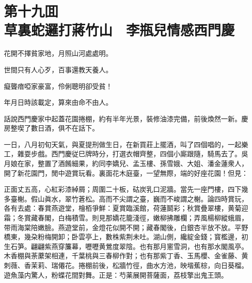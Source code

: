 
\chapter*{第十九囬　\\草裏蛇邏打蔣竹山　李瓶兒情感西門慶}


\begin{myquote}
花開不擇貧家地，月照山河處處明。

世間只有人心歹，百事還教天養人。

癡聾瘖啞家豪富，伶俐聰明卻受貧！

年月日時該載定，算來由命不由人。
\end{myquote}

話說西門慶家中起蓋花園捲棚，約有半年光景，裝修油漆完備，前後煥然一新。慶房整喫了數日酒，俱不在話下。

一日，八月初旬天氣，與夏提刑做生日，在新買莊上擺酒，叫了四個唱的，一起樂工，雜耍步戲。西門慶従巳牌時分，打選衣帽齊整，四個小廝跟隨，騎馬去了。吳月娘在家，整置了酒餚細果，約同李嬌兒、孟玉樓、孫雪娥、大姐、潘金蓮衆人，開了新花園門，閒中遊賞玩看。裏面花木庭臺，一望無際，端的好座花園！但見：

\begin{myquote}
正面丈五高，心紅彩漆綽屑；周圍二十板，𥑮炭乳口泥牆。當先一座門樓，四下幾多臺榭。假山眞水，翠竹蒼松。高而不尖謂之臺，巍而不峻謂之榭。論四時賞玩，各有去處：春賞燕遊堂，檜栢爭鮮：夏賞臨溪館，荷蓮鬬彩；秋賞疊翠樓，黄菊迎霜；冬賞藏春閣，白梅積雪。則見那嬌花籠淺徑，嫩柳拂雕欄；弄風楊柳縱蛾眉，带雨海棠陪嫩臉。燕遊堂前，金燈花似開不開；藏春閣後，白銀杏半放不放。平野橋東，幾朶粉梅開卸；卧雲亭上，數株紫荆未吐。湖山側，纔綻金錢；寳檻邊，初生石笋。翩翩紫燕穿簾幕，嚦嚦黄鶯度翠陰。也有那月窻雪洞，也有那水閣風亭。木香棚與荼䕷架相連，千葉桃與三春柳作對；也有那紫丁香、玉馬櫻、金雀藤、黄刺薇、香茉莉、瑞僊花。捲棚前後，松牆竹徑，曲水方池，映堦蕉棕，向日葵榴。遊魚藻内驚人，粉蝶花間對舞。正是：芍薬展開菩薩面，荔枝擎出鬼王頭。
\end{myquote}

